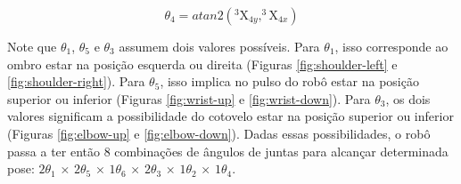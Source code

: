 \begin{equation}\label{eq:theta-4}
\theta _4 = atan2 \left ( ^{3}\textrm{X}_{4y},^{3}\textrm{X}_{4x} \right )
\end{equation}

Note que $\theta_{1}$, $\theta_{5}$ e $\theta_{3}$ assumem dois valores possíveis. Para $\theta_{1}$,
isso corresponde ao ombro estar na posição esquerda ou direita (Figuras \ref{fig:shoulder-left} e 
\ref{fig:shoulder-right}). Para $\theta_{5}$, isso implica no pulso do robô estar na posição superior
ou inferior (Figuras \ref{fig:wrist-up} e \ref{fig:wrist-down}). Para $\theta_{3}$, os dois valores
significam a possibilidade do cotovelo estar na posição superior ou inferior (Figuras \ref{fig:elbow-up}
e \ref{fig:elbow-down}). Dadas essas possibilidades, o robô passa a ter então 8 combinações de ângulos de
juntas para alcançar determinada pose: $2\theta_{1}$ × $2\theta_{5}$ × $1\theta_{6}$ × $2\theta_{3}$ × $1\theta_{2}$ × $1\theta_{4}$.

